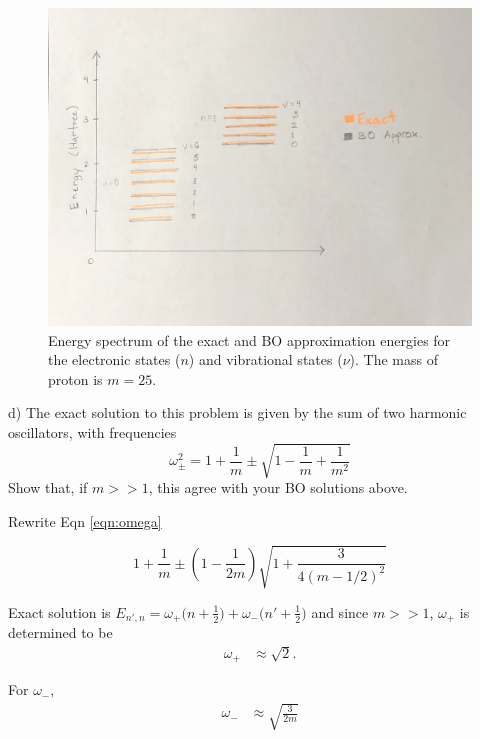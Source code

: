 \documentclass{article}
\begin{document}
\begin{figure}[H]
  \centering
  \includegraphics[scale=0.09]{bo_exact_energy.jpg}
  \caption{Energy spectrum of the exact and BO approximation energies
    for the electronic states ($n$) and vibrational states ($\nu$). The mass
    of proton is $m=25$.}
  \label{fig:bo}
\end{figure}

\noindent d) The exact solution to this problem is given by the sum of two harmonic
oscillators, with frequencies
\begin{equation}
  \omega_{\pm}^2 = 1 + \frac{1}{m}\pm\sqrt{1 - \frac{1}{m} + \frac{1}{m^2}}
  \label{eqn:omega}
\end{equation}
Show that, if $m >> 1$, this agree with your BO solutions above.
\\

{\color{blue}
  Rewrite Eqn \eqref{eqn:omega}

  \begin{equation}
    1 + \frac{1}{m}\pm(1-\frac{1}{2m})\sqrt{1+\frac{3}{4(m-1/2)^2}}
  \end{equation}
  
Exact solution is $E_{n',n}=\omega_+\Big(n+\frac{1}{2}\Big) + \omega_-\Big(n'+\frac{1}{2}\Big)$
and since $m>>1$, $\omega_+$ is determined to be
\begin{align*}
  \omega_+ & \approx \sqrt{2}.
\end{align*}

For $\omega_-$,
\begin{align*}
  \omega_- & \approx \sqrt{\frac{3}{2m}}
\end{align*}
}
\\
\end{document}
